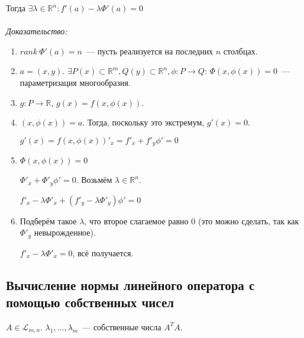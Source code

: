 \documentclass[paper=a4, fontsize=11pt]{article}
\begin{document}
Тогда $\exists \lambda \in \mathds{R}^n: f'(a) - \lambda \Phi'(a) = 0$
\\\\
\emph{Доказательство:}
\begin{enumerate}
    \item $rank\ \Phi'(a) = n$~--- пусть реализуется на последних $n$ столбцах.
    \item $a = (x,y)$. $\exists P(x) \subset \mathds{R}^m, Q(y) \subset \mathds{R}^n,
    \phi: P \rightarrow Q$: $\Phi(x,\phi(x)) = 0$~--- параметризация многообразия.
    \item $g: P \rightarrow \mathds{R}$, $g(x) = f(x,\phi(x))$.
    \item $(x,\phi(x)) = a$. Тогда, поскольку это экстремум, $g'(x) = 0$.
    
    $g'(x) = f(x,\phi(x))'_x = f'_x + f'_y \phi' = 0$
    \item $\Phi(x,\phi(x)) = 0$

    $\Phi'_x + \Phi'_y \phi' = 0$. Возьмём $\lambda \in \mathds{R}^n$.

    $f'_x - \lambda\Phi'_x + (f'_y - \lambda\Phi'_y)\phi' = 0$
    \item Подберём такое $\lambda$, что второе слагаемое равно $0$ (это можно сделать, так как $\Phi'_y$ невырожденное).

    $f'_x - \lambda\Phi'_x = 0$, всё получается.
\end{enumerate} 

\subsection{Вычисление нормы линейного оператора с помощью собственных чисел}
$A \in \mathscr{L}_{m,n}$. $\lambda_1,\dots,\lambda_m$~--- собственные числа $A^TA$.
\end{document}
